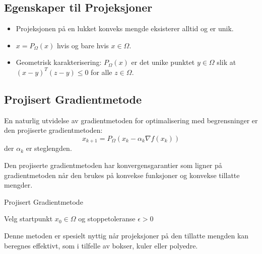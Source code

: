 \subsection{Egenskaper til Projeksjoner}
\begin{itemize}
	\item Projeksjonen på en lukket konveks mengde eksisterer alltid og er unik.
	\item \( x = P_\Omega(x) \) hvis og bare hvis \( x \in \Omega \).
	\item Geometrisk karakterisering: \( P_\Omega(x) \) er det unike punktet \( y \in \Omega \) slik at \( (x - y)^T(z - y) \leq 0 \) for alle \( z \in \Omega \).
\end{itemize}

\subsection{Projisert Gradientmetode}
En naturlig utvidelse av gradientmetoden for optimalisering med begrensninger er den projiserte gradientmetoden:
\[
	x_{k+1} = P_\Omega(x_k - \alpha_k \nabla f(x_k))
\]
der \( \alpha_k \) er steglengden.

Den projiserte gradientmetoden har konvergensgarantier som ligner på gradientmetoden når den brukes på konvekse funksjoner og konvekse tillatte mengder.

\begin{algorithm}[H]
	\caption{Projisert Gradientmetode}
	Velg startpunkt \( x_0 \in \Omega \) og stoppetoleranse \( \epsilon > 0 \)\;
\end{algorithm}

Denne metoden er spesielt nyttig når projeksjoner på den tillatte mengden kan beregnes effektivt, som i tilfelle av bokser, kuler eller polyedre.
